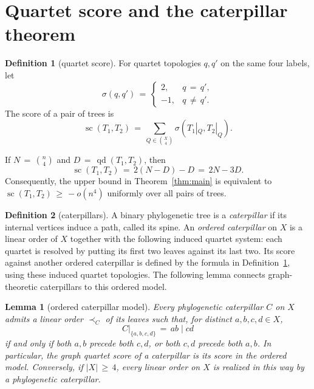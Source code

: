 \documentclass[11pt]{article}
\newtheorem{lemma}[theorem]{Lemma}
\theoremstyle{definition}
\newtheorem{definition}{Definition}
\newcommand{\qd}{\operatorname{qd}}
\newcommand{\score}{\operatorname{sc}}
\begin{document}
\section{Quartet score and the caterpillar theorem}

\begin{definition}[quartet score]\label{def:quartet-score}
For quartet topologies $q,q'$ on the same four labels, let
\[
 \sigma(q,q')\,=\,
 \begin{cases}
  2,&q\,=\,q',\\
 -1,&q\,\ne\,q'.
 \end{cases}
\]
The score of a pair of trees is
\[
 \score(T_1,T_2)
 \,=\,\sum_{Q\in\binom X4}\sigma(T_1|_Q,T_2|_Q).
\]
\end{definition}

If $N\,=\,\binom n4$ and $D\,=\,\qd(T_1,T_2)$, then
\begin{equation}\label{eq:score-distance}
 \score(T_1,T_2)\,=\,2(N-D)-D\,=\,2N-3D.
\end{equation}
Consequently, the upper bound in Theorem~\ref{thm:main} is equivalent to
$\score(T_1,T_2)\,\geq\,-o(n^4)$ uniformly over all pairs of trees.

\begin{definition}[caterpillars]\label{def:caterpillar-model}
A binary phylogenetic tree is a \emph{caterpillar} if its internal
vertices induce a path, called its spine.  An \emph{ordered caterpillar}
on $X$ is a linear order of $X$ together with the following induced quartet
system: each quartet is resolved by putting its first two leaves against
its last two.  Its score against another ordered caterpillar is defined by
the formula in Definition~\ref{def:quartet-score}, using these induced
quartet topologies.  The following lemma connects graph-theoretic
caterpillars to this ordered model.
\end{definition}

\begin{lemma}[ordered caterpillar model]\label{lem:caterpillar-order}
Every phylogenetic caterpillar $C$ on $X$ admits a linear order $\prec_C$
of its leaves such that, for distinct $a,b,c,d\in X$,
\[
 C|_{\{a,b,c,d\}}\,=\,ab\mid cd
\]
if and only if both $a,b$ precede both $c,d$, or both $c,d$ precede both
$a,b$.  In particular, the graph quartet score of a caterpillar is its
score in the ordered model.  Conversely, if $|X|\,\geq\,4$, every linear
order on $X$ is realized in this way by a phylogenetic caterpillar.
\end{lemma}
\end{document}

